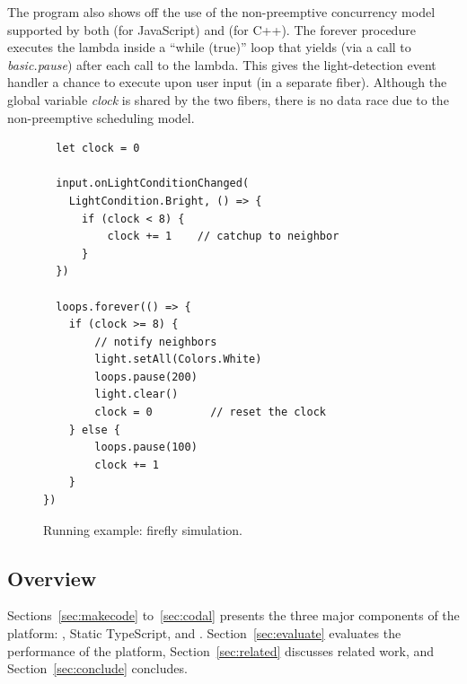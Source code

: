 The program also shows off the use of the non-preemptive concurrency
model supported by both \MC (for JavaScript) and \CO (for C++).
The forever procedure executes the lambda inside a ``while (true)''
loop that yields (via a call to \emph{basic.pause}) after each call to the lambda.
This gives the light-detection event handler a chance to execute
upon user input (in a separate fiber). Although the global variable \emph{clock} is
shared by the two fibers, there is no data race due to the non-preemptive
scheduling model.

\begin{figure}
\begin{lstlisting}
  let clock = 0

  input.onLightConditionChanged(
    LightCondition.Bright, () => {
      if (clock < 8) {
          clock += 1    // catchup to neighbor
      }
  })

  loops.forever(() => {
    if (clock >= 8) {
        // notify neighbors
        light.setAll(Colors.White)
        loops.pause(200)
        light.clear()
        clock = 0         // reset the clock
    } else {
        loops.pause(100)
        clock += 1
    }
})
\end{lstlisting}
\caption{\label{fig:example}Running example: firefly simulation.}
\end{figure}

\subsection{Overview}
Sections~\ref{sec:makecode} to~\ref{sec:codal} presents the three major components of the platform:
\MC, Static TypeScript, and \CO. Section~\ref{sec:evaluate} evaluates the performance of the platform,
Section~\ref{sec:related} discusses related work, and Section~\ref{sec:conclude}
concludes.